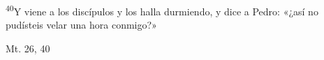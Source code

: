 \documentclass[../../rosario.tex]{subfiles}
\begin{document}
    \textsuperscript{40}Y viene a los discípulos y los halla durmiendo, y dice a Pedro: «¿así no pudísteis velar una hora conmigo?»
    \begin{flushright}
    Mt. 26, 40
    \end{flushright}
\end{document}

